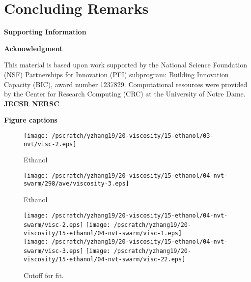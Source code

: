 \documentclass[12pt]{article}
\begin{document}
\section{Concluding Remarks}

\vspace{7 mm}
{\bf\Large Supporting Information}


\vspace{7 mm}
{\bf\Large Acknowledgment}

This material is based upon work supported by
the National Science Foundation (NSF) Partnerships for Innovation (PFI) subprogram:
Building Innovation Capacity (BIC), award number 1237829.
Computational resources were provided by the Center for Research Computing (CRC) at the University of Notre Dame.
{\bf JECSR NERSC}


\newpage
\clearpage


%
%
%






\newpage
\clearpage
{\bf\Large Figure captions}
\vspace{7 mm}


\newpage
\clearpage
\begin{figure}
\begin{center}
\texttt{[image: /pscratch/yzhang19/20-viscosity/15-ethanol/03-nvt/visc-2.eps]}
\caption{Ethanol}
\label{fig:visc-longtraj}
\end{center}
\end{figure}



\newpage
\clearpage
\begin{figure}
\begin{center}
\texttt{[image: /pscratch/yzhang19/20-viscosity/15-ethanol/04-nvt-swarm/298/ave/viscosity-3.eps]}
\caption{Ethanol}
\label{fig:visc-multi}
\end{center}
\end{figure}

\newpage
\clearpage
\begin{figure}
\begin{center}
\texttt{[image: /pscratch/yzhang19/20-viscosity/15-ethanol/04-nvt-swarm/visc-2.eps]}
\vspace {0.2in}
\texttt{[image: /pscratch/yzhang19/20-viscosity/15-ethanol/04-nvt-swarm/visc-1.eps]}
\\
\texttt{[image: /pscratch/yzhang19/20-viscosity/15-ethanol/04-nvt-swarm/visc-3.eps]}
\vspace {0.2in}
\texttt{[image: /pscratch/yzhang19/20-viscosity/15-ethanol/04-nvt-swarm/visc-22.eps]}
\caption{Cutoff for fit.}
\label{fig:cutoff-ethanol}
\end{center}
\end{figure}
\end{document}
